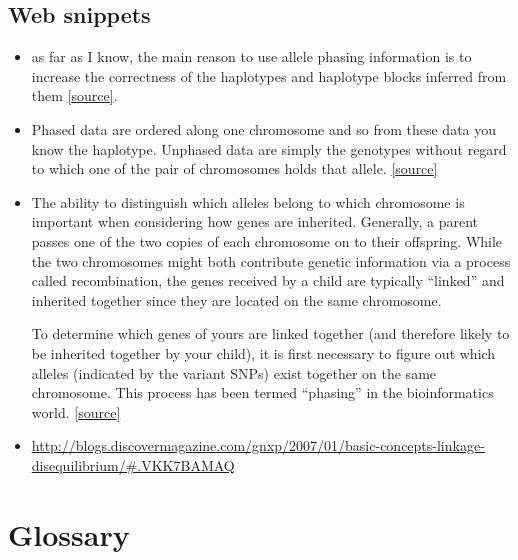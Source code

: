 \documentclass[letterpaper]{scrartcl}
\begin{document}
\subsection{Web snippets}\label{web-snippets}

\begin{itemize}
\item
  as far as I know, the main reason to use allele phasing information is
  to increase the correctness of the haplotypes and haplotype blocks
  inferred from them
  \href{https://www.biostars.org/p/5298/}{{[}source{]}}.
\item
  Phased data are ordered along one chromosome and so from these data
  you know the haplotype. Unphased data are simply the genotypes without
  regard to which one of the pair of chromosomes holds that allele.
  \href{https://www.biostars.org/p/7846/}{{[}source{]}}
\item
  The ability to distinguish which alleles belong to which chromosome is
  important when considering how genes are inherited. Generally, a
  parent passes one of the two copies of each chromosome on to their
  offspring. While the two chromosomes might both contribute genetic
  information via a process called recombination, the genes received by
  a child are typically ``linked'' and inherited together since they are
  located on the same chromosome.

  To determine which genes of yours are linked together (and therefore
  likely to be inherited together by your child), it is first necessary
  to figure out which alleles (indicated by the variant SNPs) exist
  together on the same chromosome. This process has been termed
  ``phasing'' in the bioinformatics world.
  \href{link_addresshttp://www.chromosomechronicles.com/2009/09/08/phasing-determining-which-snps-are-inherited-together/}{{[}source{]}}
\item
  \url{http://blogs.discovermagazine.com/gnxp/2007/01/basic-concepts-linkage-disequilibrium/\#.VKK7BAMAQ}
\end{itemize}

\section{Glossary}\label{glossary}
\end{document}
